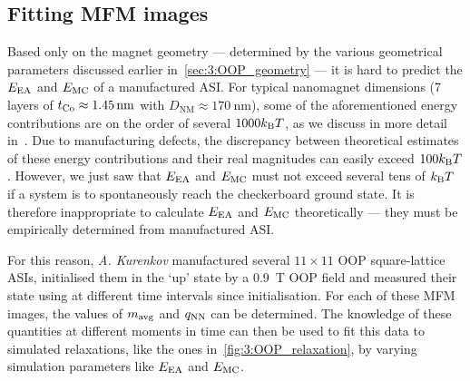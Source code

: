 \subsection{Fitting MFM images}\label{sec:3:MFM}
Based only on the magnet geometry --- determined by the various geometrical parameters discussed earlier in~\cref{sec:3:OOP_geometry} --- it is hard to predict the  $E_\mathrm{EA}$ and  $E_\mathrm{MC}$ of a manufactured ASI.
For typical nanomagnet dimensions (7 layers of $t_{\ce{Co}} \approx \SI{1.45}{\nano\metre}$ with $D_\mathrm{NM} \approx \SI{170}{\nano\metre}$), some of the aforementioned energy contributions are on the order of several $1000 \kBT$, as we discuss in more detail in~. %
Due to manufacturing defects, the discrepancy between theoretical estimates of these energy contributions and their real magnitudes can easily exceed $100 \kBT$. %
However, we just saw that $E_\mathrm{EA}$ and $E_\mathrm{MC}$ must not exceed several tens of $\kBT$ if a system is to spontaneously reach the checkerboard ground state.
It is therefore inappropriate to calculate $E_\mathrm{EA}$ and $E_\mathrm{MC}$ theoretically --- they must be empirically determined from manufactured ASI. \\\par
For this reason, \textit{A. Kurenkov} manufactured several $11 \times 11$ OOP square-lattice ASIs, initialised them in the `up' state by a \SI{0.9}{\tesla} OOP field and measured their state using  at different time intervals since initialisation.
For each of these MFM images, the values of $m_\mathrm{avg}$ and $q_\mathrm{NN}$ can be determined.
The knowledge of these quantities at different moments in time can then be used to fit this data to simulated relaxations, like the ones in~\cref{fig:3:OOP_relaxation}, by varying simulation parameters like $E_\mathrm{EA}$ and $E_\mathrm{MC}$.

